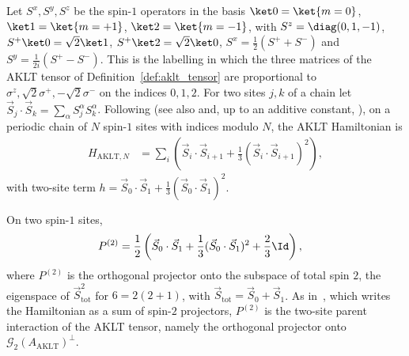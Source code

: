 \begin{definition}\label{def:aklt_polynomial_hamiltonian}
    \leanok
    Let $S^x,S^y,S^z$ be the spin-$1$ operators in the basis
    $\ket0=\ket{m=0}$, $\ket1=\ket{m=+1}$, $\ket2=\ket{m=-1}$, with
    $S^z=\diag(0,1,-1)$, $S^+\ket0=\sqrt2\ket1$, $S^+\ket2=\sqrt2\ket0$,
    $S^x=\tfrac12(S^++S^-)$ and $S^y=\tfrac1{2i}(S^+-S^-)$. This is the
    labelling in which the three matrices of the AKLT tensor of
    Definition~\ref{def:aklt_tensor} are proportional to
    $\sigma^z,\sqrt2\sigma^+,-\sqrt2\sigma^-$ on the indices $0,1,2$. For two sites
    $j,k$ of a chain let
    $\vec S_j\cdot\vec S_k=\sum_\alpha S^\alpha_jS^\alpha_k$. Following
    \cite{AKLT1987Rigorous,AKLT1988ValenceBond} (see also
    \cite[local TeX lines~340--349]{PerezGarcia2007Matrix} and, up to an
    additive constant, \cite[lines~2126--2130]{Schuch2011Phases}), on a
    periodic chain of $N$ spin-$1$ sites with indices modulo $N$, the AKLT
    Hamiltonian is
    \begin{align}
        H_{\mathrm{AKLT},N}
         & =
        \sum_i
        \left(\vec S_i\cdot\vec S_{i+1}
        +\frac13(\vec S_i\cdot\vec S_{i+1})^2\right),
        \label{eq:aklt_polynomial_hamiltonian}
    \end{align}
    with two-site term
    $h=\vec S_0\cdot\vec S_1+\tfrac13(\vec S_0\cdot\vec S_1)^2$.
\end{definition}

\begin{lemma}%
    \label{thm:aklt_spin_two_projector}
    \leanok
    On two spin-$1$ sites,
    \begin{align}
        P^{(2)}
         & =
        \frac12
        \left(\vec S_0\cdot\vec S_1
        +\frac13(\vec S_0\cdot\vec S_1)^2
        +\frac23\Id\right),
        \label{eq:aklt_spin_two_projector}
    \end{align}
    where $P^{(2)}$ is the orthogonal projector onto the subspace of total spin
    $2$, the eigenspace of $\vec S_{\mathrm{tot}}^{2}$ for $6=2(2+1)$, with
    $\vec S_{\mathrm{tot}}=\vec S_0+\vec S_1$. As in~\cite{AKLT1987Rigorous},
    which writes the Hamiltonian as a sum of spin-$2$ projectors, $P^{(2)}$ is
    the two-site parent interaction of the AKLT tensor, namely the orthogonal
    projector onto $\mathcal G_2(A_{\mathrm{AKLT}})^{\perp}$.
\end{lemma}

